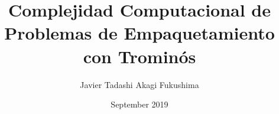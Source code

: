 \usepackage[utf8]{inputenc}
\usepackage{amsfonts}
\usepackage{csquotes} %
\usepackage[
	spanish
]{babel} %
\usepackage[
	backend=biber,
	style=numeric,
	sorting=none,
	maxbibnames=99
]{biblatex} %
\usepackage{amsmath} %
\usepackage{amsthm} %
\usepackage{siunitx} %
\usepackage{graphicx} %
\usepackage{xcolor} %
\usepackage{import} %
\usepackage{changepage} %
\usepackage{multirow} %
\usepackage[
	Algoritmo
]{algorithm} %
\usepackage[
	noend
]{algpseudocode} %
\usepackage{caption} %
\usepackage[
	list=true
]{subcaption} %
\usepackage{booktabs} %
\usepackage{imakeidx} %
\usepackage{geometry} %
\usepackage{setspace} %
\usepackage{chngcntr} %
\usepackage{hyperref} %
\usepackage{amssymb} %
\usepackage{environ} %
\usepackage{mathrsfs} %
\usepackage{titlesec} %
\usepackage{enumitem} %
\usepackage{multicol} %
\usepackage{cleveref} %

\makeindex[title=ÍNDICE ALFABÉTICO, options= -s index.ist, intoc]



\title{Complejidad Computacional de Problemas de Empaquetamiento con Trominós}
\author{Javier Tadashi Akagi Fukushima}
\date{September 2019}

\geometry{
	a4paper, 
	tmargin = 2.5cm,
	bmargin = 2cm,
	rmargin = 1.5cm,
	lmargin = 2.5cm
}

